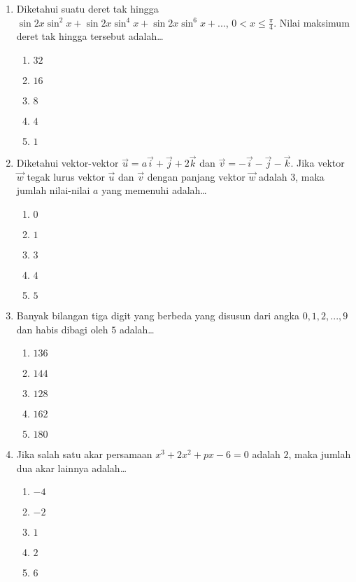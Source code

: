 \documentclass[A4,12PT, english, twocolumn]{journal}
\begin{document}
\begin{enumerate}
\item Diketahui suatu deret tak hingga $\sin 2x \sin ^2x + \sin 2x \sin ^4 x + \sin 2x \sin ^6 x + ...$, $ 0 < x \leq \frac{\pi}{4} $. Nilai maksimum deret tak hingga tersebut adalah\dots
	\begin{enumerate}
       \item $32$ 
       \item $16$   
       \item $8$ 
       \item $4$   
       \item $1$ 
	\end{enumerate}

\item Diketahui vektor-vektor $\vec{u} = a\vec{i}+\vec{j}+2\vec{k}$ dan $\vec{v} = -\vec{i}-\vec{j}-\vec{k}$. Jika vektor $\vec{w}$ tegak lurus vektor $\vec{u}$ dan $\vec{v}$ dengan panjang vektor $\vec{w}$ adalah $3$, maka jumlah nilai-nilai $a$ yang memenuhi adalah\dots
	\begin{enumerate}
       \item $0$ 
       \item $1$   
       \item $3$ 
       \item $4$   
       \item $5$
	\end{enumerate}  

\item Banyak bilangan tiga digit yang berbeda yang disusun dari angka $0,1,2,...,9$ dan habis dibagi oleh $5$ adalah\dots
	\begin{enumerate}
       \item $136$ 
       \item $144$   
       \item $128$  
       \item $162$    
       \item $180$
	\end{enumerate}

\item Jika salah satu akar persamaan $x^3 + 2x^2 + px - 6 = 0$ adalah $2$, maka jumlah dua akar lainnya adalah\dots
	\begin{enumerate}
       \item $-4$  
       \item $-2$    
       \item $1$  
       \item $2$     
       \item $6$
	\end{enumerate}


\end{enumerate}
\end{document}
